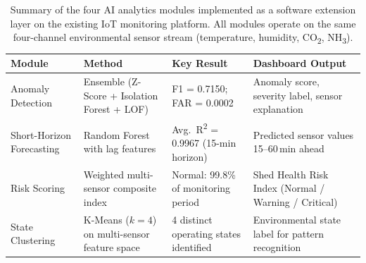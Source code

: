 \begin{table}[htbp]
  \centering
  \caption{Summary of the four AI analytics modules implemented as a software extension
           layer on the existing IoT monitoring platform. All modules operate on the
           same four-channel environmental sensor stream (temperature, humidity,
           CO\textsubscript{2}, NH\textsubscript{3}).}
  \label{tab:ai_summary}
  \begin{tabular}{p{2.8cm}p{3.8cm}p{2.8cm}p{3.2cm}}
    \hline
    \textbf{Module} & \textbf{Method} & \textbf{Key Result} & \textbf{Dashboard Output} \\
    \hline
    Anomaly Detection &
      Ensemble (Z-Score + Isolation Forest + LOF) &
      F1 = 0.7150; FAR = 0.0002 &
      Anomaly score, severity label, sensor explanation \\[4pt]
    Short-Horizon Forecasting &
      Random Forest with lag features &
      Avg.\ R\textsuperscript{2} = 0.9967 (15-min horizon) &
      Predicted sensor values 15--60\,min ahead \\[4pt]
    Risk Scoring &
      Weighted multi-sensor composite index &
      Normal: 99.8\% of monitoring period &
      Shed Health Risk Index (Normal / Warning / Critical) \\[4pt]
    State Clustering &
      K-Means ($k=4$) on multi-sensor feature space &
      4 distinct operating states identified &
      Environmental state label for pattern recognition \\
    \hline
  \end{tabular}
\end{table}
